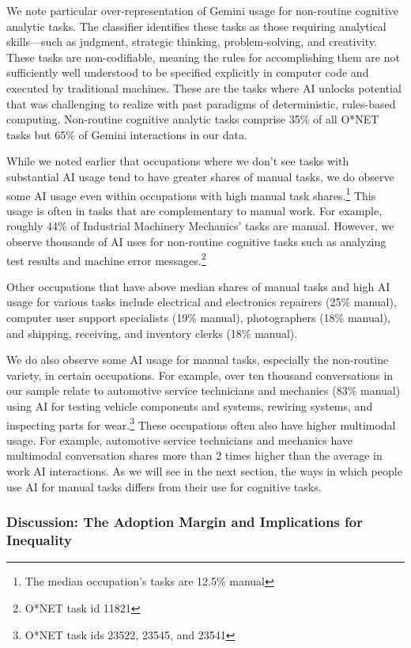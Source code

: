 \documentclass[11pt,a4paper]{article}
\begin{document}
We note particular over-representation of Gemini usage for non-routine cognitive analytic tasks. The \citet{NBERw33941} classifier identifies these tasks as those requiring analytical skills---such as judgment, strategic thinking, problem-solving, and creativity. These tasks are non-codifiable, meaning the rules for accomplishing them are not sufficiently well understood to be specified explicitly in computer code and executed by traditional machines. These are the tasks where AI unlocks potential that was challenging to realize with past paradigms of deterministic, rules-based computing. Non-routine cognitive analytic tasks comprise 35\% of all O*NET tasks but 65\% of Gemini interactions in our data.

While we noted earlier that occupations where we don't see tasks with substantial AI usage tend to have greater shares of manual tasks, we do observe some AI usage even within occupations with high manual task shares.\footnote{The median occupation's tasks are 12.5\% manual} This usage is often in tasks that are complementary to manual work. For example, roughly 44\% of Industrial Machinery Mechanics' tasks are manual. However, we observe thousands of AI uses for non-routine cognitive tasks such as analyzing test results and machine error messages.\footnote{O*NET task id 11821}

Other occupations that have above median shares of manual tasks and high AI usage for various tasks include electrical and electronics repairers (25\% manual), computer user support specialists (19\% manual), photographers (18\% manual), and shipping, receiving, and inventory clerks (18\% manual).

We do also observe some AI usage for manual tasks, especially the non-routine variety, in certain occupations. For example, over ten thousand conversations in our sample relate to automotive service technicians and mechanics (83\% manual) using AI for testing vehicle components and systems, rewiring systems, and inspecting parts for wear.\footnote{O*NET task ids 23522, 23545, and 23541} These occupations often also have higher multimodal usage. For example, automotive service technicians and mechanics have multimodal conversation shares more than 2 times higher than the average in work AI interactions. As we will see in the next section, the ways in which people use AI for manual tasks differs from their use for cognitive tasks.

\subsubsection*{Discussion: The Adoption Margin and Implications for Inequality}
\end{document}

